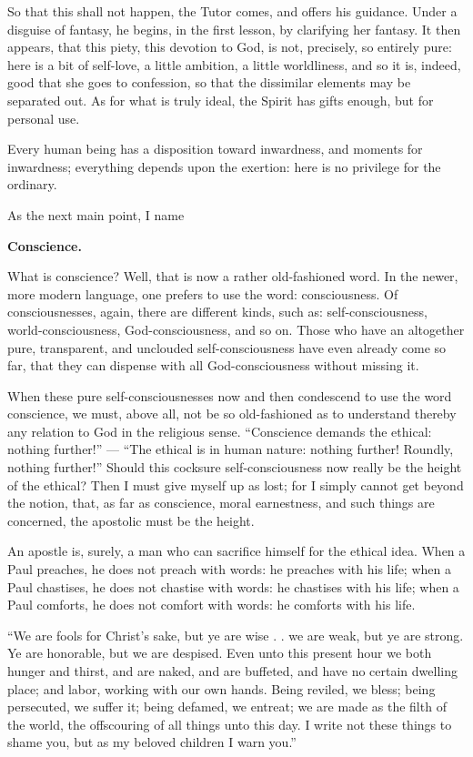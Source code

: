 \documentclass[12pt,a4paper]{book}
\begin{document}
So that this shall not happen, the Tutor comes, and offers his guidance. Under a disguise of fantasy, he begins, in the first lesson, by clarifying her fantasy. It then appears, that this piety, this devotion to God, is not, precisely, so entirely pure: here is a bit of self-love, a little ambition, a little worldliness, and so it is, indeed, good that she goes to confession, so that the dissimilar elements may be separated out. As for what is truly ideal, the Spirit has gifts enough, but for personal use.

Every human being has a disposition toward inwardness, and moments for inwardness; everything depends upon the exertion: here is no privilege for the ordinary.

As the next main point, I name

\begin{center}
\textbf{Conscience.}
\end{center}

What is conscience? Well, that is now a rather old-fashioned word. In the newer, more modern language, one prefers to use the word: consciousness. Of consciousnesses, again, there are different kinds, such as: self-consciousness, world-consciousness, God-consciousness, and so on. Those who have an altogether pure, transparent, and unclouded self-consciousness have even already come so far, that they can dispense with all God-consciousness without missing it.

When these pure self-consciousnesses now and then condescend to use the word conscience, we must, above all, not be so old-fashioned as to understand thereby any relation to God in the religious sense. ``Conscience demands the ethical: nothing further!'' --- ``The ethical is in human nature: nothing further! Roundly, nothing further!''
Should this cocksure self-consciousness now really be the height of the ethical? Then I must give myself up as lost; for I simply cannot get beyond the notion, that, as far as conscience, moral earnestness, and such things are concerned, the apostolic must be the height.

An apostle is, surely, a man who can sacrifice himself for the ethical idea. When a Paul preaches, he does not preach with words: he preaches with his life; when a Paul chastises, he does not chastise with words: he chastises with his life; when a Paul comforts, he does not comfort with words: he comforts with his life.

``We are fools for Christ's sake, but ye are wise . . we are weak, but ye are strong. Ye are honorable, but we are despised. Even unto this present hour we both hunger and thirst, and are naked, and are buffeted, and have no certain dwelling place; and labor, working with our own hands. Being reviled, we bless; being persecuted, we suffer it; being defamed, we entreat; we are made as the filth of the world, the offscouring of all things unto this day. I write not these things to shame you, but as my beloved children I warn you.''
\end{document}
